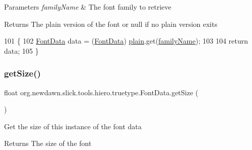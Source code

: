 \begin{DoxyParams}{Parameters}
{\em family\+Name} & The font family to retrieve \\
\hline
\end{DoxyParams}
\begin{DoxyReturn}{Returns}
The plain version of the font or null if no plain version exits 
\end{DoxyReturn}

\begin{DoxyCode}
101                                                        \{
102         \mbox{\hyperlink{classorg_1_1newdawn_1_1slick_1_1tools_1_1hiero_1_1truetype_1_1_font_data_a749bc5408e8c04106d580a31b5c9e597}{FontData}} data = (\mbox{\hyperlink{classorg_1_1newdawn_1_1slick_1_1tools_1_1hiero_1_1truetype_1_1_font_data_a749bc5408e8c04106d580a31b5c9e597}{FontData}}) \mbox{\hyperlink{classorg_1_1newdawn_1_1slick_1_1tools_1_1hiero_1_1truetype_1_1_font_data_af00cfaf27e50e7d9254460d9584311f4}{plain}}.get(\mbox{\hyperlink{classorg_1_1newdawn_1_1slick_1_1tools_1_1hiero_1_1truetype_1_1_font_data_a287c606f09e3581f4eaea1b7bd81ded1}{familyName}});
103         
104         \textcolor{keywordflow}{return} data;
105     \}
\end{DoxyCode}
\mbox{\label{classorg_1_1newdawn_1_1slick_1_1tools_1_1hiero_1_1truetype_1_1_font_data_a79b92fcb829cda72932798ccea4773bd}} 
\subsubsection{\texorpdfstring{get\+Size()}{getSize()}}
{\footnotesize\ttfamily float org.\+newdawn.\+slick.\+tools.\+hiero.\+truetype.\+Font\+Data.\+get\+Size (\begin{DoxyParamCaption}{ }\end{DoxyParamCaption})\hspace{0.3cm}{\ttfamily [inline]}}

Get the size of this instance of the font data

\begin{DoxyReturn}{Returns}
The size of the font 
\end{DoxyReturn}


